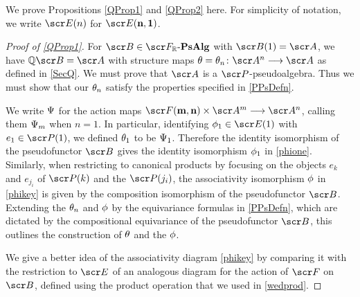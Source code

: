 \documentclass{amsart}
\theoremstyle{definition}
\numberwithin{equation}{section}
\newcommand{\bm}{\mathbf{m}}
\newcommand{\bn}{\mathbf{n}}
\newcommand{\FPR}{\sF_{\bR}\text{-}\mathbf{PsAlg}}
\begin{document}
We prove Propositions \ref{QProp1} and \ref{QProp2} here.   For simplicity of notation, we write $\sE(n)$ for $\sE(\textbf{n},\textbf{1})$. 

\begin{proof}[Proof of \autoref{QProp1}]
For $\sB\in \FPR$ with $\sB(1) =\sA$, we have $\bQ\sB = \sA$ with structure maps $\tha = \tha_n\colon \sA^n \rtarr \sA$   as defined in \autoref{SecQ}.  We must prove that $\sA$ is a $\sP$-pseudoalgebra.
Thus we must show that our $\theta_n$ satisfy the properties specified in \autoref{PPsDefn}.   

We write $\Psi$ for the action maps $\sF(\bm,\bn)\times \sA^m \rtarr \sA^n$, calling them $\Psi_m$ when $n=1$.  In particular, identifying $\ph_1\in \sE(1)$ with $e_1\in \sP(1)$, we defined $\theta_1$ to be 
$\Psi_1$.  Therefore the identity isomorphism of the pseudofunctor $\sB$ gives the identity isomorphism $\phi_1$ in \autoref{phione}.  Similarly, when restricting to canonical products by focusing on the objects $e_k$ and $e_{j_i}$ of $\sP(k)$ and the $\sP(j_i)$, the associativity isomorphism $\phi$ in \autoref{phikey} is given by the composition isomorphism of the pseudofunctor $\sB$.  Extending the $\theta_n$ and $\phi$ by the equivariance formulas in \autoref{PPsDefn}, which are dictated by the compositional equivariance of the pseudofunctor $\sB$, this outlines the construction of $\theta$ and the $\phi$. 

We give a better idea of the associativity diagram \autoref{phikey} by comparing it with the restriction to 
$\sE$ of an analogous diagram for the action of  $\sF$ on $\sB$, defined using the product operation that we used in \autoref{wedprod}. 


\end{proof}
\end{document}
